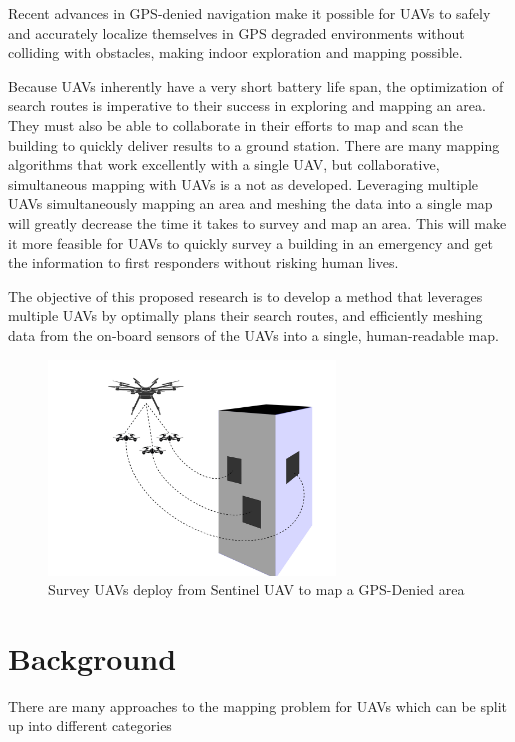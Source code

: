 \documentclass[12pt, letterpaper]{article}
\begin{document}
Recent advances in GPS-denied navigation \cite{Wheeler2017} make it possible for UAVs to safely and accurately localize themselves in GPS degraded environments without colliding with obstacles, making indoor exploration and mapping possible. 

Because UAVs inherently have a very short battery life span, the optimization of search routes is imperative to their success in exploring and mapping an area. They must also be able to collaborate in their efforts to map and scan the building to quickly deliver results to a ground station. There are many mapping algorithms that work excellently with a single UAV, but collaborative, simultaneous mapping with UAVs is a not as developed. Leveraging multiple UAVs simultaneously mapping an area and meshing the data into a single map will greatly decrease the time it takes to survey and map an area. This will make it more feasible for UAVs to quickly survey a building in an emergency and get the information to first responders without risking human lives.

The objective of this proposed research is to develop a method that leverages multiple UAVs by optimally plans their search routes, and efficiently meshing data from the on-board sensors of the UAVs into a single, human-readable map. 

\begin{figure}[h] %
   \centering
   \includegraphics[trim = 0mm 0mm 0mm 0mm,clip,width=3in]{survey_drone_illustration.png}
   \caption{Survey UAVs deploy from Sentinel UAV to map a GPS-Denied area}
   \label{fig:sentinel_survey}
\end{figure}

\section{Background}

There are many approaches to the mapping problem for UAVs which can be split up into different categories
\end{document}

